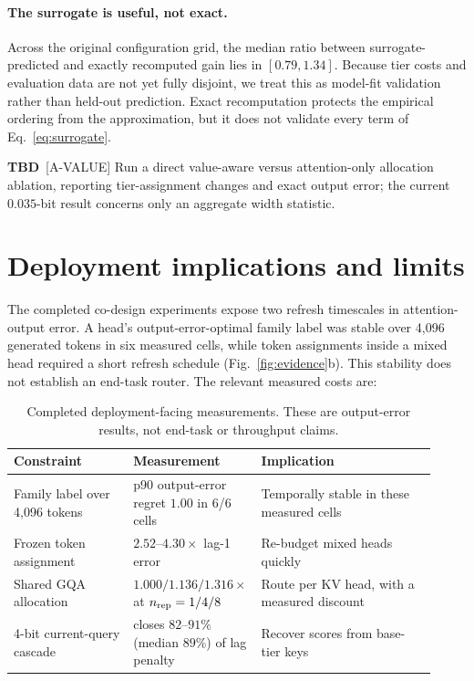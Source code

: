 \documentclass{article}
\newcommand{\tbd}[1]{{\color{tbdcol}\textbf{TBD}~#1}}
\theoremstyle{definition}
\begin{document}
\paragraph{The surrogate is useful, not exact.}
Across the original configuration grid, the median ratio between surrogate-predicted and exactly recomputed gain lies in $[0.79,1.34]$.  Because tier costs and evaluation data are not yet fully disjoint, we treat this as model-fit validation rather than held-out prediction.  Exact recomputation protects the empirical ordering from the approximation, but it does not validate every term of Eq.~\ref{eq:surrogate}.

\tbd{[A-VALUE] Run a direct value-aware versus attention-only allocation ablation, reporting tier-assignment changes and exact output error; the current $0.035$-bit result concerns only an aggregate width statistic.}

\section{Deployment implications and limits}
\label{sec:deployment}

The completed co-design experiments expose two refresh timescales in attention-output error.  A head's output-error-optimal family label was stable over 4,096 generated tokens in six measured cells, while token assignments inside a mixed head required a short refresh schedule (Fig.~\ref{fig:evidence}b).  This stability does not establish an end-task router.  The relevant measured costs are:

\begin{table}[t]
\centering
\small
\setlength{\tabcolsep}{4pt}
\caption{Completed deployment-facing measurements. These are output-error results, not end-task or throughput claims.}
\label{tab:deployment}
\begin{tabular}{@{}p{0.29\linewidth}p{0.22\linewidth}p{0.41\linewidth}@{}}
\toprule
\textbf{Constraint} & \textbf{Measurement} & \textbf{Implication} \\
\midrule
Family label over 4,096 tokens & p90 output-error regret $1.00$ in 6/6 cells & Temporally stable in these measured cells \\
Frozen token assignment & $2.52$--$4.30\times$ lag-1 error & Re-budget mixed heads quickly \\
Shared GQA allocation & $1.000/1.136/1.316\times$ at $n_{\rm rep}=1/4/8$ & Route per KV head, with a measured discount \\
4-bit current-query cascade & closes $82$--$91\%$ (median $89\%$) of lag penalty & Recover scores from base-tier keys \\
\bottomrule
\end{tabular}
\vspace{-2mm}
\end{table}
\end{document}

